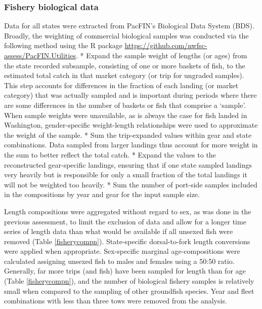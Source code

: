 \documentclass[11pt,
  english,
  a4paper,
]{article}
\begin{document}

\hypertarget{fishery-biological-data}{%
\subsubsection{Fishery biological data}\label{fishery-biological-data}}

\leavevmode\tagmcend\tagstructend


Data for all states were extracted from PacFIN's Biological Data System (BDS). Broadly, the weighting of commercial biological samples was conducted via the following method using the R package {\href{PacFIN.Utilities}{https://github.com/nwfsc-assess/PacFIN.Utilities}\leavevmode\tagmcend\tagstructend}. * Expand the sample weight of lengths (or ages) from the state recorded subsample, consisting of one or more baskets of fish, to the estimated total catch in that market category (or trip for ungraded samples). This step accounts for differences in the fraction of each landing (or market category) that was actually sampled and is important during periods where there are some differences in the number of baskets or fish that comprise a `sample'. When sample weights were unavailable, as is always the case for fish landed in Washington, gender-specific weight-length relationships were used to approximate the weight of the sample. * Sum the trip-expanded values within gear and state combinations. Data sampled from larger landings thus account for more weight in the sum to better reflect the total catch. * Expand the values to the reconstructed gear-specific landings, ensuring that if one state sampled landings very heavily but is responsible for only a small fraction of the total landings it will not be weighted too heavily. * Sum the number of port-side samples included in the compositions by year and gear for the input sample size.

\leavevmode\tagmcend\tagstructend\par


Length compositions were aggregated without regard to sex, as was done in the previous assessment, to limit the exclusion of data and allow for a longer time series of length data than what would be available if all unsexed fish were removed (Table \ref{fisherycompn}). State-specific dorsal-to-fork length conversions were applied when appropriate. Sex-specific marginal age-compositions were calculated assigning unsexed fish to males and females using a 50:50 ratio. Generally, far more trips (and fish) have been sampled for length than for age (Table \ref{fisherycompn}), and the number of biological fishery samples is relatively small when compared to the sampling of other groundfish species. Year and fleet combinations with less than three tows were removed from the analysis.
\end{document}
